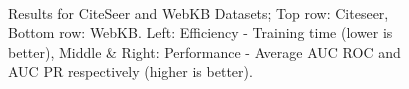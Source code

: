 \documentclass[sigconf]{acmart}
\begin{document}
\begin{figure}[t]
{\label{fig:webkbROC}
}%
%
\\
%
\caption{Results for CiteSeer and WebKB Datasets; Top row: Citeseer, Bottom row: WebKB. Left: Efficiency - Training time (lower is better), Middle \& Right: Performance - Average AUC ROC and AUC PR respectively (higher is better).}
\label{fig:results1}
\end{figure}
\end{document}
